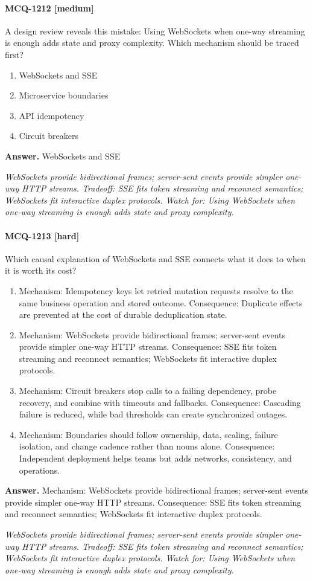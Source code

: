 \paragraph{MCQ-1212 [medium]} A design review reveals this mistake: Using WebSockets when one-way streaming is enough adds state and proxy complexity. Which mechanism should be traced first?
\begin{enumerate}[label=\Alph*.]
\item WebSockets and SSE
\item Microservice boundaries
\item API idempotency
\item Circuit breakers
\end{enumerate}
\noindent\textbf{Answer.} WebSockets and SSE
\par\textit{WebSockets provide bidirectional frames; server-sent events provide simpler one-way HTTP streams. Tradeoff: SSE fits token streaming and reconnect semantics; WebSockets fit interactive duplex protocols. Watch for: Using WebSockets when one-way streaming is enough adds state and proxy complexity.}
\paragraph{MCQ-1213 [hard]} Which causal explanation of WebSockets and SSE connects what it does to when it is worth its cost?
\begin{enumerate}[label=\Alph*.]
\item Mechanism: Idempotency keys let retried mutation requests resolve to the same business operation and stored outcome. Consequence: Duplicate effects are prevented at the cost of durable deduplication state.
\item Mechanism: WebSockets provide bidirectional frames; server-sent events provide simpler one-way HTTP streams. Consequence: SSE fits token streaming and reconnect semantics; WebSockets fit interactive duplex protocols.
\item Mechanism: Circuit breakers stop calls to a failing dependency, probe recovery, and combine with timeouts and fallbacks. Consequence: Cascading failure is reduced, while bad thresholds can create synchronized outages.
\item Mechanism: Boundaries should follow ownership, data, scaling, failure isolation, and change cadence rather than nouns alone. Consequence: Independent deployment helps teams but adds networks, consistency, and operations.
\end{enumerate}
\noindent\textbf{Answer.} Mechanism: WebSockets provide bidirectional frames; server-sent events provide simpler one-way HTTP streams. Consequence: SSE fits token streaming and reconnect semantics; WebSockets fit interactive duplex protocols.
\par\textit{WebSockets provide bidirectional frames; server-sent events provide simpler one-way HTTP streams. Tradeoff: SSE fits token streaming and reconnect semantics; WebSockets fit interactive duplex protocols. Watch for: Using WebSockets when one-way streaming is enough adds state and proxy complexity.}

